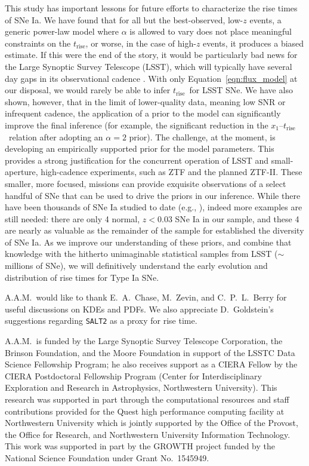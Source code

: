 \documentclass[twocolumn]{./aastex63}
\newcommand{\trise}{$t_\mathrm{rise}$}
\begin{document}
This study has important lessons for future efforts to characterize the rise
times of SNe Ia. We have found that for all but the best-observed, low-$z$
events, a generic power-law model where $\alpha$ is allowed to vary does not
place meaningful constraints on the \trise, or worse, in the case of high-$z$
events, it produces a biased estimate. If this were the end of the story, it
would be particularly bad news for the Large Synoptic Survey Telescope (LSST),
which will typically have several day gaps in its observational cadence
\citep{Ivezic08}. With only Equation~\ref{eqn:flux_model} at our disposal, we
would rarely be able to infer \trise\ for LSST SNe. We have also shown, however,
that in the limit of lower-quality data, meaning low SNR or infrequent cadence,
the application of a prior to the model can significantly improve the final
inference (for example, the significant reduction in the $x_1$--\trise\ relation
after adopting an $\alpha = 2$ prior). The challenge, at the moment, is
developing an empirically supported prior for the model parameters. This
provides a strong justification for the concurrent operation of LSST and
small-aperture, high-cadence experiments, such as ZTF and the planned ZTF-II.
These smaller, more focused, missions can provide exquisite observations of a
select handful of SNe that can be used to drive the priors in our inference.
While there have been thousands of SNe Ia studied to date (e.g.,
\citealt{Jones17}), indeed more examples are still needed: there are only 4
normal, $z < 0.03$ SNe Ia in our sample, and these 4 are nearly as valuable as
the remainder of the sample for established the diversity of SNe Ia. As we
improve our understanding of these priors, and combine that knowledge with the
hitherto unimaginable statistical samples from LSST ($\sim$millions of SNe), we
will definitively understand the early evolution and distribution of rise times
for Type Ia SNe.


\acknowledgements

A.A.M.~would like to thank E.~A.~Chase, M.~Zevin, and C.~P.~L.~Berry for useful
discussions on KDEs and PDFs. We also appreciate D.~Goldstein's suggestions
regarding \texttt{SALT2} as a proxy for rise time.

A.A.M.~is funded by the Large Synoptic Survey Telescope Corporation, the Brinson
Foundation, and the Moore Foundation in support of the LSSTC Data Science
Fellowship Program; he also receives support as a CIERA Fellow by the CIERA
Postdoctoral Fellowship Program (Center for Interdisciplinary Exploration and
Research in Astrophysics, Northwestern University). This research was supported
in part through the computational resources and staff contributions provided for
the Quest high performance computing facility at Northwestern University which
is jointly supported by the Office of the Provost, the Office for Research, and
Northwestern University Information Technology. This work was supported in part
by the GROWTH project funded by the National Science Foundation under Grant
No.~1545949.
\end{document}
